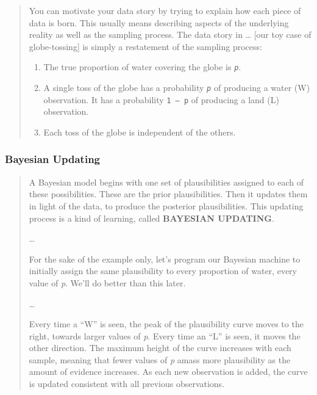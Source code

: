 \documentclass[
  letterpaper,
  DIV=11,
  numbers=noendperiod]{scrreprt}
\providecommand{\tightlist}{%
  \setlength{\itemsep}{0pt}\setlength{\parskip}{0pt}}\usepackage{longtable,booktabs,array}
\begin{document}
\begin{quote}
You can motivate your data story by trying to explain how each piece of
data is born. This usually means describing aspects of the underlying
reality as well as the sampling process. The data story in \ldots{}
{[}our toy case of globe-tossing{]} is simply a restatement of the
sampling process:

\begin{enumerate}
\def\labelenumi{\arabic{enumi}.}
\tightlist
\item
  The true proportion of water covering the globe is \emph{\texttt{p}}.
\item
  A single toss of the globe has a probability \emph{\texttt{p}} of
  producing a water (W) observation. It has a probability
  \texttt{1\ –\ p} of producing a land (L) observation.
\item
  Each toss of the globe is independent of the others.
\end{enumerate}
\end{quote}

\hypertarget{bayesian-updating}{%
\subsubsection{Bayesian Updating}\label{bayesian-updating}}

\begin{quote}
A Bayesian model begins with one set of plausibilities assigned to each
of these possibilities. These are the prior plausibilities. Then it
updates them in light of the data, to produce the posterior
plausibilities. This updating process is a kind of learning, called
\textbf{BAYESIAN UPDATING}.

\ldots{}

For the sake of the example only, let's program our Bayesian machine to
initially assign the same plausibility to every proportion of water,
every value of \emph{p}. We'll do better than this later.

\ldots{}

Every time a ``W'' is seen, the peak of the plausibility curve moves to
the right, towards larger values of \emph{p}. Every time an ``L'' is
seen, it moves the other direction. The maximum height of the curve
increases with each sample, meaning that fewer values of \emph{p} amass
more plausibility as the amount of evidence increases. As each new
observation is added, the curve is updated consistent with all previous
observations.
\end{quote}
\end{document}
